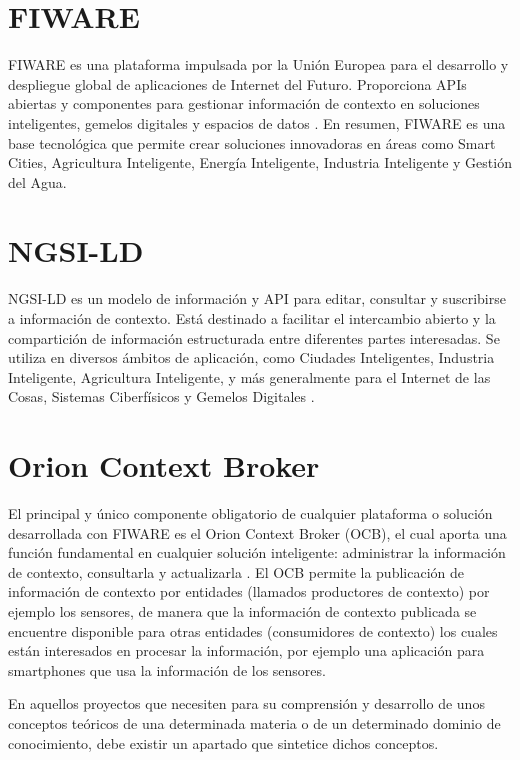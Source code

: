 
\section{FIWARE}
FIWARE es una plataforma impulsada por la Unión Europea para el desarrollo y despliegue 
global de aplicaciones de Internet del Futuro. Proporciona APIs abiertas y componentes para 
gestionar información de contexto en soluciones inteligentes, gemelos digitales y espacios de 
datos \cite{fiware2024}. En resumen, FIWARE es una base tecnológica que permite crear soluciones 
innovadoras en áreas como Smart Cities, Agricultura Inteligente, Energía Inteligente, Industria 
Inteligente y Gestión del Agua. 

\section{NGSI-LD}
NGSI-LD es un modelo de información y API para editar, consultar y suscribirse a información 
de contexto. Está destinado a facilitar el intercambio abierto y la compartición de información 
estructurada entre diferentes partes interesadas. Se utiliza en diversos ámbitos de aplicación, 
como Ciudades Inteligentes, Industria Inteligente, Agricultura Inteligente, y más generalmente 
para el Internet de las Cosas, Sistemas Ciberfísicos y Gemelos Digitales \cite{etsi2024}.

\section{Orion Context Broker}
El principal y único componente obligatorio de cualquier plataforma o solución desarrollada con FIWARE es el Orion Context Broker (OCB), el cual aporta una función fundamental en cualquier solución inteligente: administrar la información de contexto, consultarla y actualizarla \cite{orion2024}. El OCB permite la publicación de información de contexto por entidades (llamados productores de contexto) por ejemplo los sensores, de manera que la información de contexto publicada se encuentre disponible para otras entidades (consumidores de contexto) los cuales están interesados en procesar la información, por ejemplo una aplicación para smartphones que usa la información de los sensores.




En aquellos proyectos que necesiten para su comprensión y desarrollo de unos conceptos teóricos de una determinada materia o de un determinado dominio de conocimiento, debe existir un apartado que sintetice dichos conceptos.

